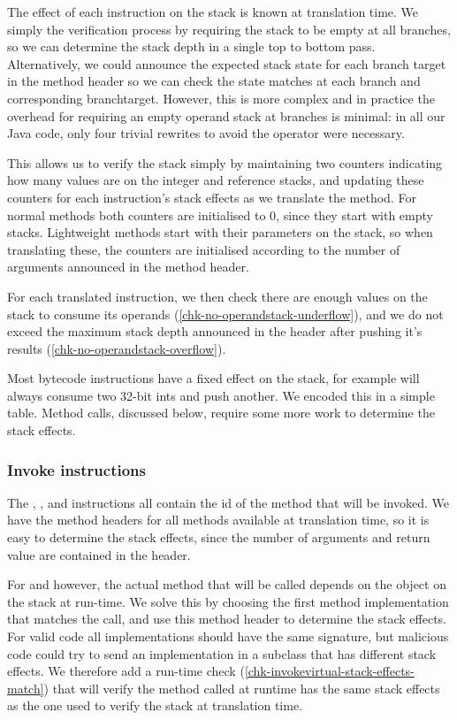 The effect of each instruction on the stack is known at translation time. We simply the verification process by requiring the stack to be empty at all branches, so we can determine the stack depth in a single top to bottom pass. Alternatively, we could announce the expected stack state for each branch target in the method header so we can check the state matches at each branch and corresponding branchtarget. However, this is more complex and in practice the overhead for requiring an empty operand stack at branches is minimal: in all our Java code, only four trivial rewrites to avoid the  operator were necessary.

This allows us to verify the stack simply by maintaining two counters indicating how many values are on the integer and reference stacks, and updating these counters for each instruction's stack effects as we translate the method. For normal methods both counters are initialised to 0, since they start with empty stacks. Lightweight methods start with their parameters on the stack, so when translating these, the counters are initialised according to the number of arguments announced in the method header.

For each translated instruction, we then check there are enough values on the stack to consume its operands (\ref{chk-no-operandstack-underflow}), and we do not exceed the maximum stack depth announced in the header after pushing it's results (\ref{chk-no-operandstack-overflow}).

Most bytecode instructions have a fixed effect on the stack, for example  will always consume two 32-bit ints and push another. We encoded this in a simple table. Method calls, discussed below, require some more work to determine the stack effects. 

\subsubsection{Invoke instructions}
The , , and  instructions all contain the id of the method that will be invoked. We have the method headers for all methods available at translation time, so it is easy to determine the stack effects, since the number of arguments and return value are contained in the header.

For  and  however, the actual method that will be called depends on the object on the stack at run-time. We solve this by choosing the first method implementation that matches the call, and use this method header to determine the stack effects. For valid code all implementations should have the same signature, but malicious code could try to send an implementation in a subclass that has different stack effects. We therefore add a run-time check (\ref{chk-invokevirtual-stack-effects-match}) that will verify the method called at runtime has the same stack effects as the one used to verify the stack at translation time.


